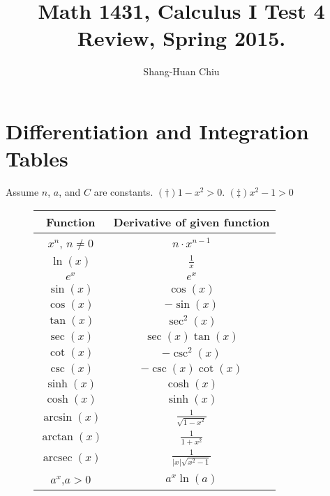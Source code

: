 \documentclass[12pt]{article}
\DeclareMathOperator{\arcsec}{arcsec}
\begin{document}
\title{\Large Math 1431, Calculus I Test 4 Review, Spring 2015.}
\author{ Shang-Huan Chiu }

\maketitle



\section{Differentiation and Integration Tables}

Assume $n$, $a$, and $C$ are constants. $(\dag) 1-x^2 >0$. $(\ddag) x^2-1>0$
\begin{figure}[htb]\large
 \begin{minipage}[b]{0.5\textwidth} 
  \renewcommand\arraystretch{1.5}%
\centering 
\begin{tabular}{|c|c|}
\hline
Function                                 & Derivative of given function \\ \hline
$x^n$, $n \neq 0$ 	& $n\cdot x^{n-1}$                   \\ \hline
$\ln (x)$                                       & $\frac{1}{x}$                    \\ \hline
$e^x$                                       & $e^x$                    \\ \hline
$\sin(x)$                                       & $\cos(x)$                    \\ \hline
$\cos(x)$                                       & $-\sin(x)$                   \\ \hline
$\tan(x)$                                       & $\sec^2(x)$                  \\ \hline
$\sec(x)$                                       & $\sec(x) \tan(x)$            \\ \hline
$\cot(x)$                                       & $-\csc^2(x)$                 \\ \hline
$\csc(x)$                                       & $-\csc(x) \cot(x)$           \\ \hline
$\sinh(x)$                                       & $\cosh(x)$                    \\ \hline
$\cosh(x)$                                       & $\sinh(x)$                   \\ \hline
 $\arcsin(x)$                                      & $\frac{1}{\sqrt{1-x^2}}$                  \\ \hline
 $\arctan(x)$                                                      &   $\frac{1}{1+x^2}$     \\ \hline
 $\arcsec(x)$                                               & $\frac{1}{|x| \sqrt{x^2-1}}$                             \\ \hline
 $a^x$,$a>0$                                              &  $ a^x \ln (a)$                            \\ \hline



\end{tabular}
\end{minipage}
\end{figure}
\end{document}
